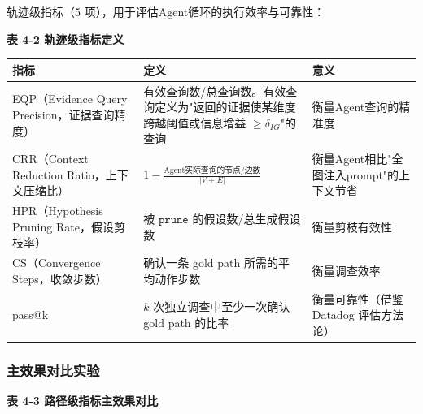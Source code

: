 \documentclass[a4paper,12pt]{ctexart}
\begin{document}
轨迹级指标（5 项），用于评估Agent循环的执行效率与可靠性：

\textbf{表 4-2 轨迹级指标定义}

\begin{table}[htbp]
\centering
\small
\setlength{\tabcolsep}{4pt}
\begin{tabular}{|l|l|l|}
\hline
\textbf{指标} & \textbf{定义} & \textbf{意义} \\
\hline
EQP（Evidence Query Precision，证据查询精度） & 有效查询数/总查询数。有效查询定义为"返回的证据使某维度跨越阈值或信息增益 $\geq \delta_{IG}$"的查询 & 衡量Agent查询的精准度 \\
\hline
CRR（Context Reduction Ratio，上下文压缩比） & $1 - \frac{\text{Agent实际查询的节点/边数}}{\vert V\vert+\vert E\vert}$ & 衡量Agent相比"全图注入prompt"的上下文节省 \\
\hline
HPR（Hypothesis Pruning Rate，假设剪枝率） & 被 $\texttt{prune}$ 的假设数/总生成假设数 & 衡量剪枝有效性 \\
\hline
CS（Convergence Steps，收敛步数） & 确认一条 gold path 所需的平均动作步数 & 衡量调查效率 \\
\hline
pass@k & $k$ 次独立调查中至少一次确认 gold path 的比率 & 衡量可靠性（借鉴 Datadog 评估方法论） \\
\hline
\end{tabular}
\end{table}

\subsubsection{主效果对比实验}

\textbf{表 4-3 路径级指标主效果对比}
\end{document}
